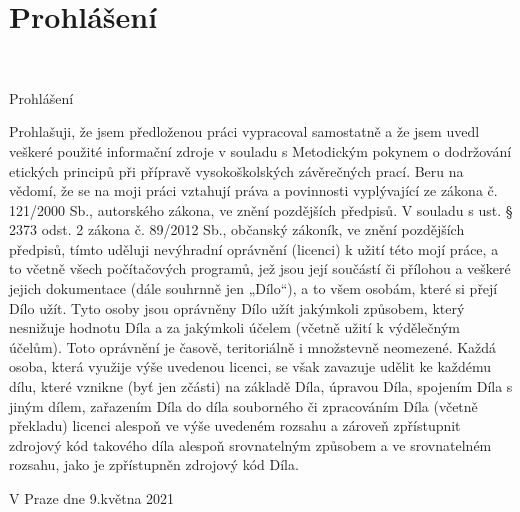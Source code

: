 \documentclass[a4paper,czech,unicode,twoside]{book}[2019/12/20]
\makeatletter
\def\frontchapterfont{\Large \bfseries}
\newcommand{\frontchapternotprinted}[1]{%
  \begingroup
  \let\@makechapterhead\@gobble %
  \let\cleardoublepage\clearpage
  \chapter{#1}
  \endgroup
}
\theoremstyle{plain}
\theoremstyle{definition}
\theoremstyle{remark}
\numberwithin{theorem}{chapter}
\newenvironment{prohlaseni}{
  {{\frontchapterfont\begin{flushright}{\color{heading}Prohlášení}\end{flushright}}}%
  \bigskip
  \noindent\ignorespaces}
\makeatother
\begin{document}
\frontchapternotprinted{Prohlášení}
~
\vfill
\begin{prohlaseni}
Prohlašuji, že jsem předloženou práci vypracoval samostatně a že jsem uvedl veškeré
použité informační zdroje v souladu s Metodickým pokynem o dodržování etických
principů při přípravě vysokoškolských závěrečných prací.
\newline
\newline
Beru na vědomí, že se na moji práci vztahují práva a povinnosti vyplývající ze zákona
č. 121/2000 Sb., autorského zákona, ve znění pozdějších předpisů. V souladu s ust.
§ 2373 odst. 2 zákona č. 89/2012 Sb., občanský zákoník, ve znění pozdějších předpisů,
tímto uděluji nevýhradní oprávnění (licenci) k užití této mojí práce, a to včetně všech 
počítačových programů, jež jsou její součástí či přílohou a veškeré jejich
dokumentace (dále souhrnně jen „Dílo“), a to všem osobám, které si přejí Dílo užít.
Tyto osoby jsou oprávněny Dílo užít jakýmkoli způsobem, který nesnižuje hodnotu
Díla a za jakýmkoli účelem (včetně užití k výdělečným účelům). Toto oprávnění je
časově, teritoriálně i množstevně neomezené. Každá osoba, která využije výše
uvedenou licenci, se však zavazuje udělit ke každému dílu, které vznikne (byť jen
zčásti) na základě Díla, úpravou Díla, spojením Díla s jiným dílem, zařazením Díla
do díla souborného či zpracováním Díla (včetně překladu) licenci alespoň ve výše
uvedeném rozsahu a zároveň zpřístupnit zdrojový kód takového díla alespoň
srovnatelným způsobem a ve srovnatelném rozsahu, jako je zpřístupněn zdrojový
kód Díla.

\vskip 1cm
\noindent
V Praze dne 9.\;května 2021 \hspace{.3\textwidth} \dotfill
\end{prohlaseni}
\end{document}
